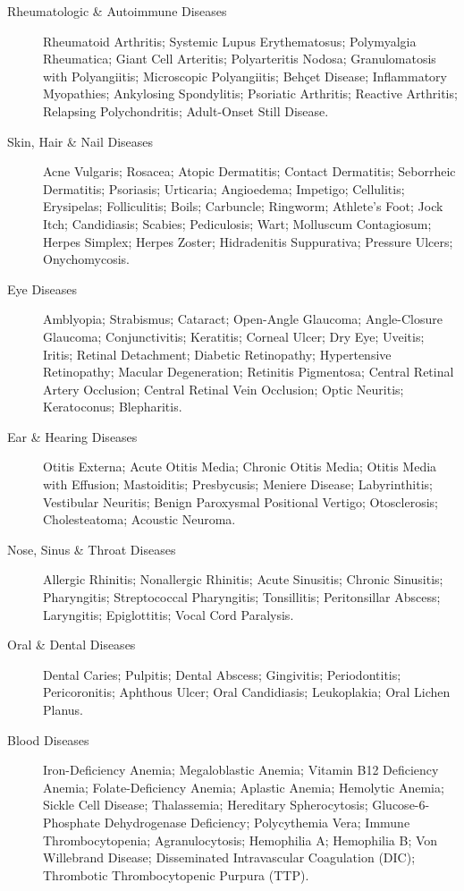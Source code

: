 \begin{description}
%
\item[Rheumatologic \& Autoimmune Diseases] Rheumatoid Arthritis; Systemic Lupus Erythematosus; Polymyalgia Rheumatica; Giant Cell Arteritis; Polyarteritis Nodosa; Granulomatosis with Polyangiitis; Microscopic Polyangiitis; Behçet Disease; Inflammatory Myopathies; Ankylosing Spondylitis; Psoriatic Arthritis; Reactive Arthritis; Relapsing Polychondritis; Adult-Onset Still Disease.
%
\item[Skin, Hair \& Nail Diseases] Acne Vulgaris; Rosacea; Atopic Dermatitis; Contact Dermatitis; Seborrheic Dermatitis; Psoriasis; Urticaria; Angioedema; Impetigo; Cellulitis; Erysipelas; Folliculitis; Boils; Carbuncle; Ringworm; Athlete's Foot; Jock Itch; Candidiasis; Scabies; Pediculosis; Wart; Molluscum Contagiosum; Herpes Simplex; Herpes Zoster; Hidradenitis Suppurativa; Pressure Ulcers; Onychomycosis.
%
\item[Eye Diseases] Amblyopia; Strabismus; Cataract; Open-Angle Glaucoma; Angle-Closure Glaucoma; Conjunctivitis; Keratitis; Corneal Ulcer; Dry Eye; Uveitis; Iritis; Retinal Detachment; Diabetic Retinopathy; Hypertensive Retinopathy; Macular Degeneration; Retinitis Pigmentosa; Central Retinal Artery Occlusion; Central Retinal Vein Occlusion; Optic Neuritis; Keratoconus; Blepharitis.
%
\item[Ear \& Hearing Diseases] Otitis Externa; Acute Otitis Media; Chronic Otitis Media; Otitis Media with Effusion; Mastoiditis; Presbycusis; Meniere Disease; Labyrinthitis; Vestibular Neuritis; Benign Paroxysmal Positional Vertigo; Otosclerosis; Cholesteatoma; Acoustic Neuroma.
%
\item[Nose, Sinus \& Throat Diseases] Allergic Rhinitis; Nonallergic Rhinitis; Acute Sinusitis; Chronic Sinusitis; Pharyngitis; Streptococcal Pharyngitis; Tonsillitis; Peritonsillar Abscess; Laryngitis; Epiglottitis; Vocal Cord Paralysis.
%
\item[Oral \& Dental Diseases] Dental Caries; Pulpitis; Dental Abscess; Gingivitis; Periodontitis; Pericoronitis; Aphthous Ulcer; Oral Candidiasis; Leukoplakia; Oral Lichen Planus.
%
\item[Blood Diseases] Iron-Deficiency Anemia; Megaloblastic Anemia; Vitamin B12 Deficiency Anemia; Folate-Deficiency Anemia; Aplastic Anemia; Hemolytic Anemia; Sickle Cell Disease; Thalassemia; Hereditary Spherocytosis; Glucose-6-Phosphate Dehydrogenase Deficiency; Polycythemia Vera; Immune Thrombocytopenia; Agranulocytosis; Hemophilia A; Hemophilia B; Von Willebrand Disease; Disseminated Intravascular Coagulation (DIC); Thrombotic Thrombocytopenic Purpura (TTP).

\end{description}
